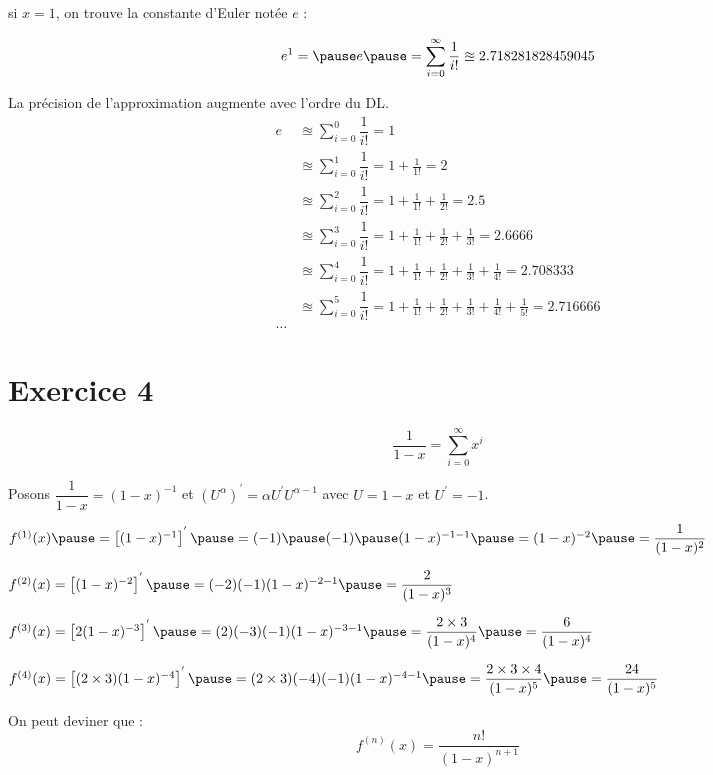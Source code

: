 \documentclass[9pt,handout,professionalfonts,hyperref]{beamer}
\begin{document}
\begin{frame}
si $x=1$, on trouve la constante d'Euler notée $e$ : 

$$e^1= \pause e\pause =\sum_{i=0}^{\infty}\dfrac{1}{i!} \approxeq 2.718281828459045$$ 

La précision de l'approximation augmente avec l'ordre du DL.
\[\begin{aligned}
e
&\approxeq \sum_{i=0}^{0}\dfrac{1}{i!} = 1\\
&\approxeq \sum_{i=0}^{1}\dfrac{1}{i!} = 1 + \frac{1}{1!} = 2\\
&\approxeq \sum_{i=0}^{2}\dfrac{1}{i!} = 1 + \frac{1}{1!} + \frac{1}{2!} = 2.5\\
&\approxeq \sum_{i=0}^{3}\dfrac{1}{i!} = 1 + \frac{1}{1!} + \frac{1}{2!} + \frac{1}{3!} = 2.6666\\
&\approxeq \sum_{i=0}^{4}\dfrac{1}{i!} = 1 + \frac{1}{1!} + \frac{1}{2!} + \frac{1}{3!} + \frac{1}{4!}= 2.708333\\
&\approxeq \sum_{i=0}^{5}\dfrac{1}{i!} = 1 + \frac{1}{1!} + \frac{1}{2!} + \frac{1}{3!} + \frac{1}{4!}+ \frac{1}{5!}= 2.716666\\
\dots 
\end{aligned}\]

\end{frame}

\section{Exercice 4}
\begin{frame}
$$
\dfrac{1}{1-x}=\sum_{i=0}^{\infty}x^i 
$$
\pause
\medskip

Posons $\dfrac{1}{1-x} = (1-x)^{-1} $ \pause et $(U^\alpha)^{'} = \alpha U^{'} U^{\alpha-1}$ \pause avec $U = 1-x$ \pause et $U^{'} = -1$. 

\pause
\medskip
$f^{(1)}(x) \pause = \left[{(1-x)^{-1}}\right]^{'} \pause = (-1)\pause (-1)\pause (1-x)^{-1-1} \pause = (1-x)^{-2} \pause = \dfrac{1}{(1-x)^2}$
\pause
\medskip

$f^{(2)}(x) = \left[ (1-x)^{-2} \right]^{'} \pause =(-2)(-1)(1-x)^{-2-1} \pause =\dfrac{2}{(1-x)^3}$
\pause
\medskip

$f^{(3)}(x) = \left[ 2(1-x)^{-3} \right]^{'} \pause =(2)(-3)(-1)(1-x)^{-3-1} \pause =\dfrac{2\times3}{(1-x)^4}\pause =\dfrac{6}{(1-x)^4}$
\pause
\medskip

$f^{(4)}(x) = \left[ (2\times 3)(1-x)^{-4} \right]^{'} \pause =(2\times3)(-4)(-1)(1-x)^{-4-1} \pause =\dfrac{2\times3\times4}{(1-x)^5}\pause =\dfrac{24}{(1-x)^5}$
\pause

\medskip
On peut deviner que :
$$f^{(n)}(x) =\dfrac{n!}{(1-x)^{n+1}}$$
\end{frame}
\end{document}
